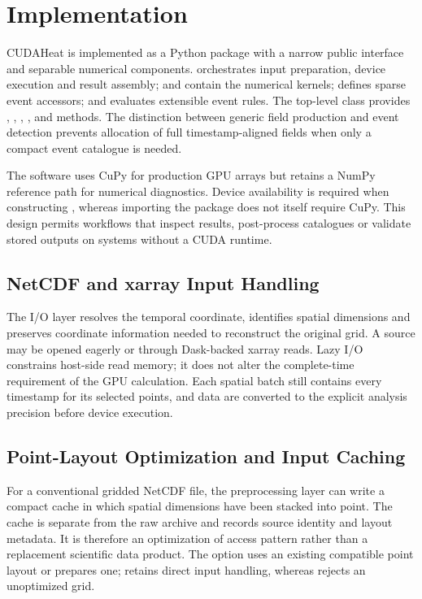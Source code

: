 \section{Implementation}


CUDAHeat is implemented as a Python package with a narrow public interface and separable numerical components.  orchestrates input preparation, device execution and result assembly;  and  contain the numerical kernels;  defines sparse event accessors; and  evaluates extensible event rules. The top-level  class provides , , , ,  and  methods. The distinction between generic field production and event detection prevents allocation of full timestamp-aligned fields when only a compact event catalogue is needed.

The software uses CuPy for production GPU arrays but retains a NumPy reference path for numerical diagnostics. Device availability is required when constructing , whereas importing the package does not itself require CuPy. This design permits workflows that inspect results, post-process catalogues or validate stored outputs on systems without a CUDA runtime.

\subsection{NetCDF and xarray Input Handling}

The I/O layer resolves the temporal coordinate, identifies spatial dimensions and preserves coordinate information needed to reconstruct the original grid. A source may be opened eagerly or through Dask-backed xarray reads. Lazy I/O constrains host-side read memory; it does not alter the complete-time requirement of the GPU calculation. Each spatial batch still contains every timestamp for its selected points, and data are converted to the explicit analysis precision before device execution.

\subsection{Point-Layout Optimization and Input Caching}

For a conventional gridded NetCDF file, the preprocessing layer can write a compact cache in which spatial dimensions have been stacked into point. The cache is separate from the raw archive and records source identity and layout metadata. It is therefore an optimization of access pattern rather than a replacement scientific data product. The option  uses an existing compatible point layout or prepares one;  retains direct input handling, whereas  rejects an unoptimized grid.

